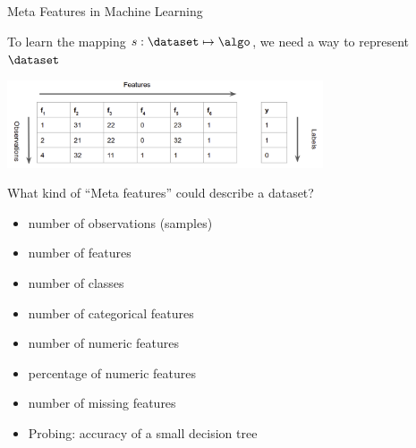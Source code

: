 \begin{frame}[c]{Meta Features in Machine Learning}
	
To learn the mapping $s: \dataset \mapsto \algo$, we need a way to represent $\dataset$

\begin{center}
	\includegraphics[width=0.7\textwidth]{images/ml_data}
\end{center}


What kind of ``Meta features'' could describe a dataset? \hands

\pause
\begin{itemize}
	\item number of observations (samples)
	\item number of features
	\item number of classes
	\item number of categorical features
	\item number of numeric features
	\item percentage of numeric features
	\item number of missing features
	\item Probing: accuracy of a small decision tree
\end{itemize}
	
	
\end{frame}
